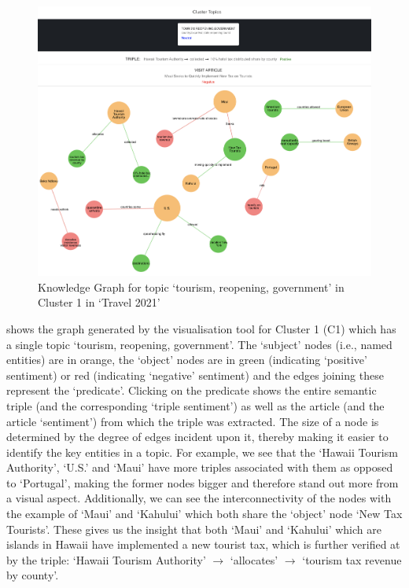 \begin{figure}[H]
  \centering
  \includegraphics[width=\linewidth]{images/travel2021_triples_witha.png}
  \caption{Knowledge Graph for topic `tourism, reopening, government' in Cluster 1 in `Travel 2021'}
  \vspace{-1ex}
  \label{fig:triples_travel2021}
\end{figure}



 shows the graph generated by the visualisation tool for Cluster 1 (C1) which has a single topic `tourism, reopening, government'. The `subject' nodes (i.e., named entities) are in orange, the `object' nodes are in green (indicating `positive' sentiment) or red (indicating `negative' sentiment) and the edges joining these represent the `predicate'. Clicking on the predicate shows the entire semantic triple (and the corresponding `triple sentiment') as well as the article (and the article `sentiment') from which the triple was extracted. The size of a node is determined by the degree of edges incident upon it, thereby making it easier to identify the key entities in a topic. For example, we see that the `Hawaii Tourism Authority', `U.S.' and `Maui' have more triples associated with them as opposed to `Portugal', making the former nodes bigger and therefore stand out more from a visual aspect. Additionally, we can see the interconnectivity of the nodes with the example of `Maui' and `Kahului' which both share the `object' node `New Tax Tourists'. These gives us the insight that both `Maui' and `Kahului' which are islands in Hawaii have implemented a new tourist tax, which is further verified at by the triple: `Hawaii Tourism Authority' $\rightarrow$ `allocates'  $\rightarrow$ `tourism tax revenue by county'.

